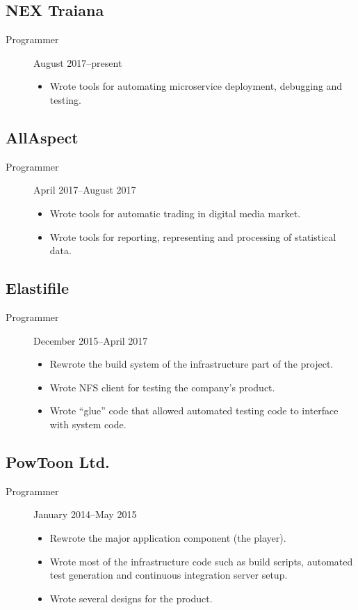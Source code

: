 \documentclass[11pt]{article}
\begin{document}
\subsection*{NEX Traiana}
\label{sec-2-1}
\begin{description}
\item[{Programmer}] August 2017--present
\begin{itemize}
\item Wrote tools for automating microservice deployment, debugging
and testing.
\end{itemize}
\end{description}

\subsection*{AllAspect}
\label{sec-2-2}
\begin{description}
\item[{Programmer}] April 2017--August 2017
\begin{itemize}
\item Wrote tools for automatic trading in digital media market.
\item Wrote tools for reporting, representing and processing of
statistical data.
\end{itemize}
\end{description}

\subsection*{Elastifile}
\label{sec-2-3}
\begin{description}
\item[{Programmer}] December 2015--April 2017
\begin{itemize}
\item Rewrote the build system of the infrastructure part of the
project.
\item Wrote NFS client for testing the company's product.
\item Wrote ``glue'' code that allowed automated testing code to
interface with system code.
\end{itemize}
\end{description}

\subsection*{PowToon Ltd.}
\label{sec-2-4}
\begin{description}
\item[{Programmer}] January 2014--May 2015
\begin{itemize}
\item Rewrote the major application component (the player).
\item Wrote most of the infrastructure code such as build scripts,
automated test generation and continuous integration server
setup.
\item Wrote several designs for the product.
\end{itemize}
\end{description}
\end{document}
